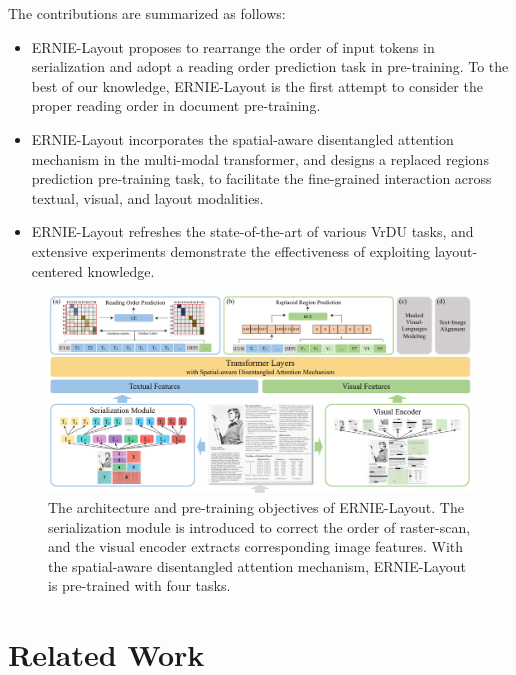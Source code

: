 \documentclass[11pt]{article}
\begin{document}
The contributions are summarized as follows:
\begin{itemize}
    \item ERNIE-Layout proposes to rearrange the order of input tokens in serialization and adopt a reading order prediction task in pre-training. To the best of our knowledge, ERNIE-Layout is the first attempt to consider the proper reading order in document pre-training.  
    \item ERNIE-Layout incorporates the spatial-aware disentangled attention mechanism in the multi-modal transformer, and designs a replaced regions prediction pre-training task, to facilitate the fine-grained interaction across textual, visual, and layout modalities.
    \item ERNIE-Layout refreshes the state-of-the-art of various VrDU tasks, and extensive experiments demonstrate the effectiveness of exploiting layout-centered knowledge.
\end{itemize}



\begin{figure}
    \centering
    \includegraphics[width=1\textwidth]{figures/ernie-layout.pdf}
    \caption{The architecture and pre-training objectives of ERNIE-Layout. The serialization module is introduced to correct the order of raster-scan, and the visual encoder extracts corresponding image features. With the spatial-aware disentangled attention mechanism, ERNIE-Layout is pre-trained with four tasks.}
    \label{fig:model}
\end{figure}


\section{Related Work}
\end{document}
